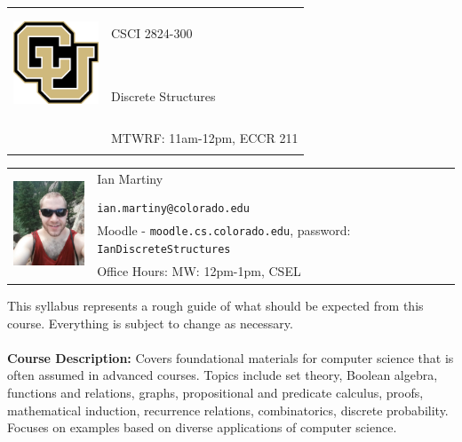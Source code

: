 \documentclass[11pt]{article}
\begin{document}
\begin{tabular}{ l l }
  \multirow{3}{*}{\includegraphics[height=1.25in,width=1in]{cuboulder-large.png}} & \LARGE CSCI 2824-300\\\\
  & \LARGE Discrete Structures\\\\
  & \LARGE MTWRF: 11am-12pm, ECCR 211 \\\\
\end{tabular}
\vspace{10mm}

\begin{tabular}{ l l }
  \multirow{6}{*}{\includegraphics[height=1.25in,width=1in]{vacationpic}} & \large Ian Martiny\\\\
  & \large \texttt{ian.martiny@colorado.edu}\\
  & \large Moodle - \texttt{moodle.cs.colorado.edu}, password: \texttt{IanDiscreteStructures}\\
  & \large Office Hours: MW: 12pm-1pm, CSEL\\
\end{tabular}

\vspace{5mm}
This syllabus represents a rough guide of what should be expected from this course. Everything is subject to change as necessary. \\


\textbf {\large \\ Course Description:} Covers foundational materials for computer science that is often assumed in advanced courses. Topics include set theory, Boolean algebra, functions and relations, graphs, propositional and predicate calculus, proofs, mathematical induction, recurrence relations, combinatorics, discrete probability. Focuses on examples based on diverse applications of computer science. 
\end{document}
